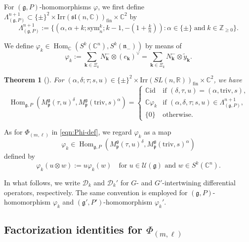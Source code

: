 \documentclass[reqno,11pt]{amsart}
\newtheorem{thm}[equation]{Theorem}
\theoremstyle{remark}
\theoremstyle{definition}
\numberwithin{equation}{section}
\newcommand{\ga}{\alpha}
\newcommand{\gL}{\Lambda}
\newcommand{\fg}{{\mathfrak g}}
\newcommand{\fn}{{\mathfrak n}}
\newcommand{\fp}{{\mathfrak p}}
\newcommand{\f}{\mathfrak}
\newcommand{\R}{\mathbb{R}}
\newcommand{\C}{\mathbb{C}}
\newcommand{\Z}{\mathbb{Z}}
\newcommand{\Cal}{\mathcal}
\newcommand{\Hom}{\operatorname{Hom}}
\newcommand{\Irr}{\mathrm{Irr}}
\newcommand{\triv}{\mathrm{triv}}
\newcommand{\fin}{\mathrm{fin}}
\newcommand{\sym}{\mathrm{sym}}
\newcommand{\id}{\mathrm{id}}
\newcommand{\Mp}{M^{\fg}_{\fp}}
\newcommand{\D}{\Cal{D}}
\begin{document}
For $(\fg, P)$-homomorphisms $\varphi$, 
we first define $\Lambda^{n+1}_{(\fg, P)} \subset 
\{\pm\}^2\times \Irr(\f{sl}(n,\C))_{\fin} \times \C^2$ by
\begin{equation}\label{eqn:gPn}
\Lambda^{n+1}_{(\fg, P)}:=\{
(\ga,\ga+k;\sym_{n}^k; k-1,  -(1+\tfrac{k}{n})) : \alpha \in \{\pm\} \; \text{and} \; k\in \Z_{\geq 0}\}.
\end{equation}

We define $\varphi_k \in 
\Hom_\C(S^k(\C^{n}), S^k(\fn_-))$ by means of
\begin{equation}\label{eqn:Hom2}
\varphi_k 
:= \sum_{\mathbf{k} \in \Xi_k} 
N_{\mathbf{k}}^-
\otimes 
(e_{\mathbf{k}})^\vee
= \sum_{\mathbf{k} \in \Xi_k} 
N_{\mathbf{k}}^-
\otimes 
\widetilde{y}_{\mathbf{k}}.
\end{equation}

\begin{thm}[{\cite[Thm.\ 4.8]{KuOr24}}]
\label{thm:Hom}
For 
$(\ga,\delta; \tau; s, u) \in \{\pm\}^2\times \Irr(SL(n,\R))_{\fin} \times \C^2$,
we have
\begin{equation*}
\Hom_{\fg, P}(\Mp(\tau,u)^\delta, \Mp(\triv, s)^\ga)
=
\begin{cases}
\C\id & \text{if $(\delta, \tau, u) = (\ga, \triv, s)$,}\\
\C \varphi_k & \text{if $(\ga, \delta, \tau; s, u)\in \gL^{n+1}_{(\fg,P)}$,}\\
\{0\} & \text{otherwise.}
\end{cases}
\end{equation*}
\end{thm}

As for $\Phi_{(m,\ell)}$ in \eqref{eqn:Phi-def}, we regard 
$\varphi_k$ as a map
\begin{equation*}
\varphi_k \in 
\Hom_{\fg, P}(\Mp(\tau,u)^\delta, \Mp(\triv, s)^\ga)
\end{equation*}
defined by
\begin{equation}\label{eqn:Phi-def2}
\varphi_k(u\otimes w) := u\varphi_k(w)
\quad 
\text{for $u \in \Cal{U}(\fg)$ and $w \in S^k(\C^{n})$.}
\end{equation}


In what follows, we write $\D_k$ and $\D_k'$ for 
$G$- and $G'$-intertwining differential operators, respectively.
The same convention is employed for $(\fg, P)$-homomorphism 
$\varphi_k$ and $(\fg', P')$-homomorphism $\varphi_k'$.

\subsection{Factorization identities for $\Phi_{(m,\ell)}$}
\label{sec:factorGVM}
\end{document}
